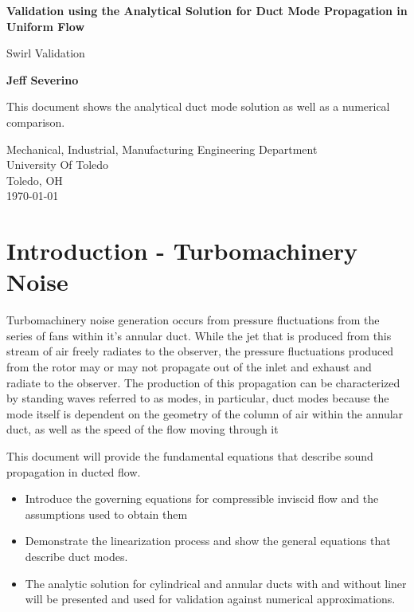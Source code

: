 \documentclass[a4paper]{report}
\begin{document}
\begin{titlepage}
    \begin{center}
        \vspace*{1cm}

        \textbf{ Validation using the %
            Analytical Solution for Duct Mode Propagation in %
        Uniform Flow} 

        \vspace{0.5cm}
        Swirl Validation

        \vspace{1.5cm}

        \textbf{Jeff Severino}

        \vfill


        This document shows the analytical duct mode solution as well as a
        numerical comparison.
        \vspace{0.8cm}


        Mechanical, Industrial, Manufacturing Engineering Department\\
        University Of Toledo\\
        Toledo, OH\\
        \today

    \end{center}
\end{titlepage}

\section{Introduction - Turbomachinery Noise}
Turbomachinery noise generation occurs from pressure fluctuations from the series 
of fans within it's annular duct. While the jet that is produced from this stream
of air freely radiates to the observer, the pressure fluctuations 
produced from the rotor may or may not propagate out of the inlet and exhaust and 
radiate to the observer. The production of this propagation can be characterized
by standing waves referred to as modes, in particular, duct modes because 
the mode itself is dependent on the geometry of the column of air within the 
annular duct, as well as the speed of the flow moving through it


This document will provide the fundamental equations that describe sound propagation
in ducted flow.

\begin{itemize}
    \item Introduce the governing equations for compressible inviscid flow and 
        the assumptions used to obtain them
    \item Demonstrate the linearization process and show the general equations
        that describe duct modes.  
    \item The analytic solution for cylindrical and annular ducts with and
        without liner will be presented and used for validation against
        numerical approximations.
 \end{itemize}
\newpage
\end{document}

